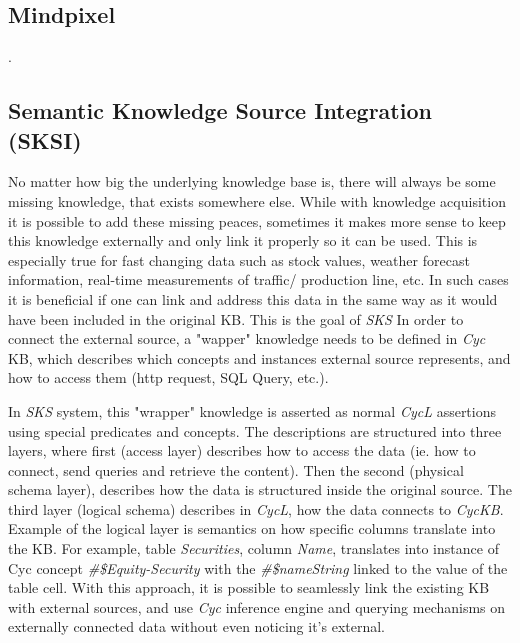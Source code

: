 \subsection{Mindpixel}. 

\subsection{Semantic Knowledge Source Integration (SKSI)}
No matter how big the underlying knowledge base is, there will always be some
missing knowledge, that exists somewhere else. While with knowledge acquisition
it is possible to add these missing peaces, sometimes it makes more sense to
keep this knowledge externally and only link it properly so it can be used.
This is especially true for fast changing data such as stock values, weather
forecast information, real-time measurements of traffic/ production line, etc.
In such cases it is beneficial if one can link and address this data in the 
same way as it would have been included in the original KB. This is the goal
of \emph{SKS}\parencite{Masters2007}
In order to connect the external source, a "wapper" knowledge needs to be
defined in \emph{Cyc} KB, which describes which concepts and instances external
source represents, and how to access them (http request, SQL Query, etc.).

In \emph{SKS} system, this "wrapper" knowledge is asserted as normal \emph{CycL}
assertions using special predicates and concepts. The descriptions are 
structured into three layers, where first (access layer) describes 
how to access the data (ie. how to connect, send queries and retrieve the 
content). Then the second (physical schema layer), describes how the data is
structured inside the original source. The third layer (logical schema) 
describes in \emph{CycL}, how  the data connects to \emph{CycKB}. Example
of the logical layer is semantics on how specific columns translate into the KB.
For example, table \emph{Securities}, column \emph{Name}, translates into
instance of Cyc concept \emph{\#\$Equity-Security} with the 
\emph{\#\$nameString} linked to the value of the table cell.
With this approach, it is possible to seamlessly link the existing KB with
external sources, and use \emph{Cyc} inference engine and querying mechanisms
on externally connected data without even noticing it's external.


